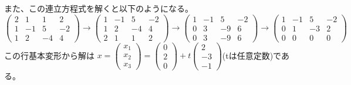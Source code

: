 \documentclass[titlepage]{jsarticle}
\begin{document}
		また、この連立方程式を解くと以下のようになる。\\
		$\displaystyle
	            \left(
	                \begin{array}{ccc|c}
	                    2 & 1 & 1 & 2 \\
	                    1 & -1 & 5 & -2\\
	                    1 & 2 & -4 & 4
	                \end{array}
	            \right)\rightarrow
			\left(
	                \begin{array}{ccc|c}
	                    1 & -1 & 5 & -2 \\
	                    1 & 2 & -4 & 4\\
	                    2 & 1 & 1 & 2
	                \end{array}
	            \right)\rightarrow
			\left(
	                \begin{array}{ccc|c}
	                    1 & -1 & 5 & -2 \\
	                    0 & 3 & -9 & 6\\
	                    0 & 3 & -9 & 6
	                \end{array}
	            \right)\rightarrow
			\left(
	                \begin{array}{ccc|c}
	                    1 & -1 & 5 & -2 \\
	                    0 & 1 & -3 & 2\\
	                    0 & 0 & 0 & 0
	                \end{array}
	            \right)
      		$
		この行基本変形から解は
		$\displaystyle
	            x=\left(
	                \begin{array}{c}
	                    x_1 \\
	                    x_2\\
	                    x_3
	                \end{array}
	            \right)=
			\left(
	                \begin{array}{c}
	                    0 \\
	                    2\\
	                    0
	                \end{array}
	            \right) + 
			t \left(
	                \begin{array}{c}
	                    2 \\
	                    -3\\
	                    -1
	                \end{array}
	            \right)
      		$(tは任意定数)である。
\end{document}
